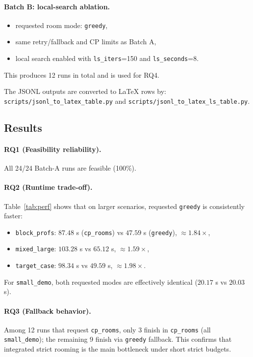 \paragraph{Batch B: local-search ablation.}
\begin{itemize}[leftmargin=*]
  \item requested room mode: \texttt{greedy},
  \item same retry/fallback and CP limits as Batch A,
  \item local search enabled with \texttt{ls\_iters}=150 and \texttt{ls\_seconds}=8.
\end{itemize}
This produces 12 runs in total and is used for RQ4.

The JSONL outputs are converted to LaTeX rows by:
\texttt{scripts/jsonl\_to\_latex\_table.py} and \texttt{scripts/jsonl\_to\_latex\_ls\_table.py}.

\subsection{Results}
\paragraph{RQ1 (Feasibility reliability).}
All 24/24 Batch-A runs are feasible (100\%).

\paragraph{RQ2 (Runtime trade-off).}
Table~\ref{tab:perf} shows that on larger scenarios, requested \texttt{greedy} is consistently faster:
\begin{itemize}[leftmargin=*]
  \item \texttt{block\_profs}: \(87.48\) s (\texttt{cp\_rooms}) vs \(47.59\) s (\texttt{greedy}), \(\approx 1.84\times\),
  \item \texttt{mixed\_large}: \(103.28\) s vs \(65.12\) s, \(\approx 1.59\times\),
  \item \texttt{target\_case}: \(98.34\) s vs \(49.59\) s, \(\approx 1.98\times\).
\end{itemize}
For \texttt{small\_demo}, both requested modes are effectively identical (\(20.17\) s vs \(20.03\) s).

\paragraph{RQ3 (Fallback behavior).}
Among 12 runs that request \texttt{cp\_rooms}, only 3 finish in \texttt{cp\_rooms}
(all \texttt{small\_demo}); the remaining 9 finish via \texttt{greedy} fallback.
This confirms that integrated strict rooming is the main bottleneck under short strict budgets.

